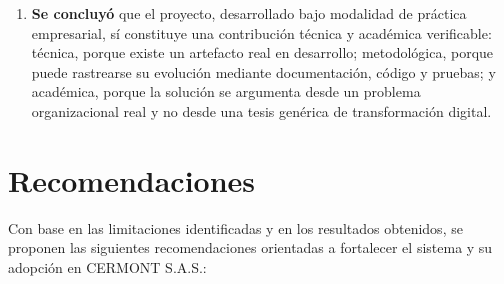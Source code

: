 \begin{enumerate}
  \item \textbf{Se concluyó} que el proyecto, desarrollado bajo modalidad de práctica empresarial, sí constituye una contribución técnica y académica verificable: técnica, porque existe un artefacto real en desarrollo; metodológica, porque puede rastrearse su evolución mediante documentación, código y pruebas; y académica, porque la solución se argumenta desde un problema organizacional real y no desde una tesis genérica de transformación digital.
\end{enumerate}

\section{Recomendaciones}

Con base en las limitaciones identificadas y en los resultados obtenidos, se proponen las siguientes recomendaciones orientadas a fortalecer el sistema y su adopción en CERMONT S.A.S.:

